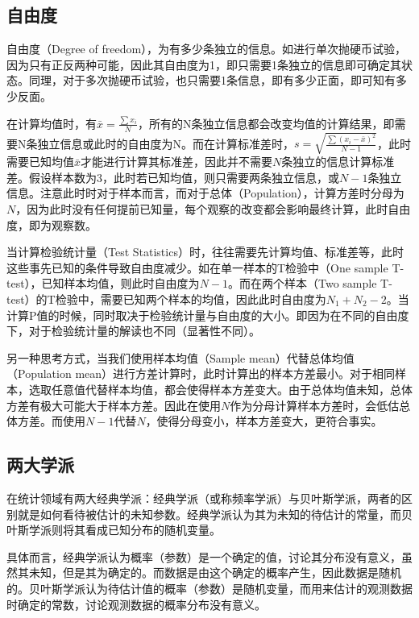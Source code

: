 \documentclass[11pt]{article}
\begin{document}
\subsection{自由度}

自由度（Degree of freedom），为有多少条独立的信息。如进行单次抛硬币试验，因为只有正反两种可能，因此其自由度为1，即只需要1条独立的信息即可确定其状态。同理，对于多次抛硬币试验，也只需要1条信息，即有多少正面，即可知有多少反面。

在计算均值时，有$\bar{x} = \tfrac{\sum x_i}{N}$，所有的N条独立信息都会改变均值的计算结果，即需要N条独立信息或此时的自由度为N。而在计算标准差时，$s = \sqrt{\frac{\sum (x_i - \bar{x})^2}{N-1}}$，此时需要已知均值$\bar{x}$才能进行计算其标准差，因此并不需要$N$条独立的信息计算标准差。假设样本数为3，此时若已知均值，则只需要两条独立信息，或$N-1$条独立信息。注意此时时对于样本而言，而对于总体（Population），计算方差时分母为$N$，因为此时没有任何提前已知量，每个观察的改变都会影响最终计算，此时自由度，即为观察数。

当计算检验统计量（Test Statistics）时，往往需要先计算均值、标准差等，此时这些事先已知的条件导致自由度减少。如在单一样本的T检验中（One sample T-test），已知样本均值，则此时自由度为$N-1$。而在两个样本（Two sample T-test）的T检验中，需要已知两个样本的均值，因此此时自由度为$N_1 + N_2 - 2$。当计算P值的时候，同时取决于检验统计量与自由度的大小。即因为在不同的自由度下，对于检验统计量的解读也不同（显著性不同）。

另一种思考方式，当我们使用样本均值（Sample mean）代替总体均值（Population mean）进行方差计算时，此时计算出的样本方差最小。对于相同样本，选取任意值代替样本均值，都会使得样本方差变大。由于总体均值未知，总体方差有极大可能大于样本方差。因此在使用$N$作为分母计算样本方差时，会低估总体方差。而使用$N-1$代替$N$，使得分母变小，样本方差变大，更符合事实。

\subsection{两大学派}

在统计领域有两大经典学派：经典学派（或称频率学派）与贝叶斯学派，两者的区别就是如何看待被估计的未知参数。经典学派认为其为未知的待估计的常量，而贝叶斯学派则将其看成已知分布的随机变量。

具体而言，经典学派认为概率（参数）是一个确定的值，讨论其分布没有意义，虽然其未知，但是其为确定的。而数据是由这个确定的概率产生，因此数据是随机的。贝叶斯学派认为待估计值的概率（参数）是随机变量，而用来估计的观测数据时确定的常数，讨论观测数据的概率分布没有意义。
\end{document}
